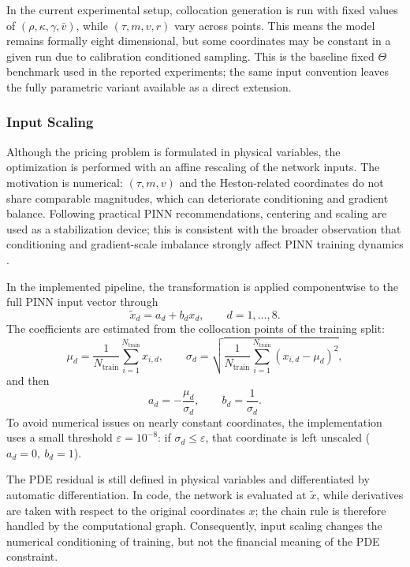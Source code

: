 In the current experimental setup, collocation generation is run with fixed values of \((\rho,\kappa,\gamma,\bar v)\), while \((\tau,m,v,r)\) vary across points. This means the model remains formally eight dimensional, but some coordinates may be constant in a given run due to calibration conditioned sampling.
This is the baseline fixed \(\Theta\) benchmark used in the reported experiments; the same input convention leaves the fully parametric variant available as a direct extension.

\subsubsection*{Input Scaling}

Although the pricing problem is formulated in physical variables, the optimization is performed with an affine rescaling of the network inputs. The motivation is numerical: \((\tau,m,v)\) and the Heston-related coordinates do not share comparable magnitudes, which can deteriorate conditioning and gradient balance. Following practical PINN recommendations, centering and scaling are used as a stabilization device; this is consistent with the broader observation that conditioning and gradient-scale imbalance strongly affect PINN training dynamics \cite{wang2021gradientpath,wang2022pinnntk,urban_2025}.

In the implemented pipeline, the transformation is applied componentwise to the full PINN input vector through
\[
\tilde x_d = a_d + b_d x_d,\qquad d=1,\dots,8.
\]
The coefficients are estimated from the collocation points of the training split:
\[
\mu_d=\frac{1}{N_{\text{train}}}\sum_{i=1}^{N_{\text{train}}}x_{i,d},
\qquad
\sigma_d=\sqrt{\frac{1}{N_{\text{train}}}\sum_{i=1}^{N_{\text{train}}}(x_{i,d}-\mu_d)^2},
\]
and then
\[
a_d=-\frac{\mu_d}{\sigma_d},\qquad b_d=\frac{1}{\sigma_d}.
\]
To avoid numerical issues on nearly constant coordinates, the implementation uses a small threshold $\varepsilon=10^{-8}$: if $\sigma_d\le\varepsilon$, that coordinate is left unscaled ($a_d=0,\ b_d=1$).

The PDE residual is still defined in physical variables and differentiated by automatic differentiation. In code, the network is evaluated at \(\tilde x\), while derivatives are taken with respect to the original coordinates \(x\); the chain rule is therefore handled by the computational graph. Consequently, input scaling changes the numerical conditioning of training, but not the financial meaning of the PDE constraint.


